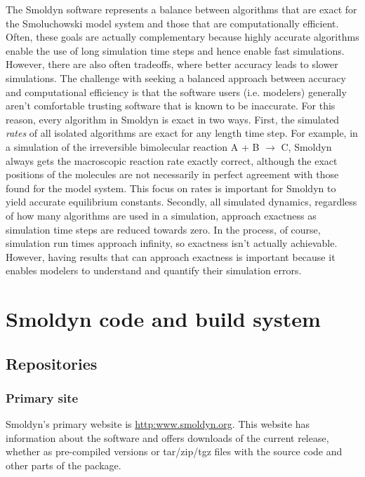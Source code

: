 \documentclass {book}
\begin{document}
The Smoldyn software represents a balance between algorithms that are exact for the Smoluchowski model system and those that are computationally efficient. Often, these goals are actually complementary because highly accurate algorithms enable the use of long simulation time steps and hence enable fast simulations. However, there are also often tradeoffs, where better accuracy leads to slower simulations. The challenge with seeking a balanced approach between accuracy and computational efficiency is that the software users (i.e. modelers) generally aren't comfortable trusting software that is known to be inaccurate. For this reason, every algorithm in Smoldyn is exact in two ways. First, the simulated \emph{rates} of all isolated algorithms are exact for any length time step. For example, in a simulation of the irreversible bimolecular reaction A + B $\rightarrow$ C, Smoldyn always gets the macroscopic reaction rate exactly correct, although the exact positions of the molecules are not necessarily in perfect agreement with those found for the model system. This focus on rates is important for Smoldyn to yield accurate equilibrium constants. Secondly, all simulated dynamics, regardless of how many algorithms are used in a simulation, approach exactness as simulation time steps are reduced towards zero. In the process, of course, simulation run times approach infinity, so exactness isn't actually achievable. However, having results that can approach exactness is important because it enables modelers to understand and quantify their simulation errors.


\chapter{Smoldyn code and build system}

\section{Repositories}

\subsection{Primary site}

Smoldyn's primary website is \url{http:www.smoldyn.org}. This website has information about the software and offers downloads of the current release, whether as pre-compiled versions or tar/zip/tgz files with the source code and other parts of the package.
\end{document}
